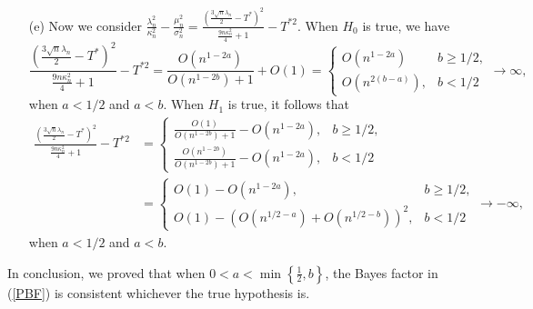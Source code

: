 \documentclass[11pt]{article}
\begin{document}
{\begin{itemize}
\item[(e)] Now we consider $\frac{\lambda_n^2}{\kappa_n^2}- \frac{\mu_n^2 }{\sigma_n^2} = \frac{\left(\frac{3\sqrt{n}\lambda_n}{2} - T^* \right)^2}{\frac{9n\kappa_n^2}{4}+1} -T^{*2}$. When $H_0$ is true, we have
$$\frac{\left(\frac{3\sqrt{n}\lambda_n}{2} - T^* \right)^2}{\frac{9n\kappa_n^2}{4}+1} -T^{*2} = \frac{O(n^{1-2a})}{O(n^{1-2b})+1} + O(1)= \begin{cases} O(n^{1-2a})&b\ge 1/2,\\O(n^{2(b-a)}),&b<1/2
    \end{cases}\rightarrow\infty,$$ when $a<1/2$ and $a<b$. When $H_1$ is true, it follows that
\begin{align*}\frac{\left(\frac{3\sqrt{n}\lambda_n}{2} - T^* \right)^2}{\frac{9n\kappa_n^2}{4}+1} -T^{*2} &=  \begin{cases} \frac{O(1)}{O(n^{1-2b})+1} - O(n^{1-2a}), &b\ge 1/2,\\\frac{O(n^{1-2b})}{O(n^{1-2b})+1} - O(n^{1-2a}),&b<1/2
    \end{cases} \\
    &=  \begin{cases} O(1)-O(n^{1-2a}),&b\ge 1/2,\\  O(1) - \left(O(n^{1/2-a}) + O(n^{1/2-b})\right)^2,&b<1/2
    \end{cases}\rightarrow-\infty,\end{align*}   when $a<1/2$ and $a<b$.
\end{itemize}

In conclusion, we proved that when $0<a<\min\left\{\frac{1}{2},b\right\}$, the Bayes factor in (\ref{PBF}) is consistent whichever the true hypothesis is.
}

\vskip4mm
\end{document}
